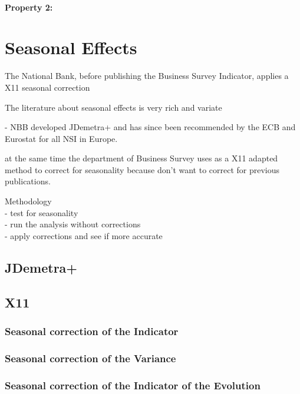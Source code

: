\documentclass[12pt,a4paper,oneside]{book}
\begin{document}
\subsubsection{Property 2: }





\chapter{Seasonal Effects}
The National Bank, before publishing the Business Survey Indicator, applies a X11 seasonal correction

The literature about seasonal effects is very rich and variate

- NBB developed JDemetra+ and has since been recommended by the ECB and Eurostat for all NSI in Europe.


at the same time the department of Business Survey uses as a X11 adapted method to correct for seasonality because don't want to correct for previous publications.


Methodology \\
- test for seasonality \\
- run the analysis without corrections \\
- apply corrections and see if more accurate \\


\section{JDemetra+}

\section{X11}

\subsection{Seasonal correction of the Indicator}

\subsection{Seasonal correction of the Variance}

\subsection{Seasonal correction of the Indicator of the Evolution}
\end{document}
